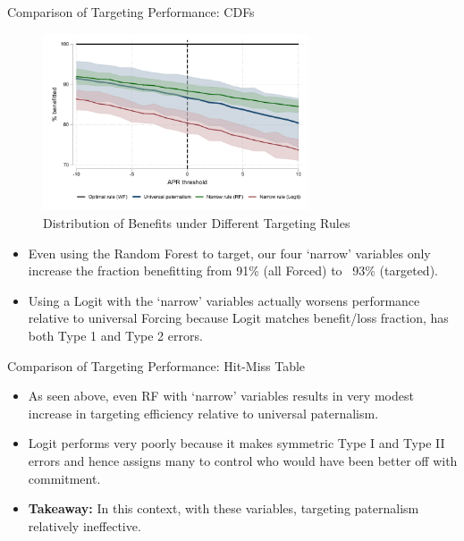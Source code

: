 \documentclass[8pt]{beamer}
\begin{document}
\begin{frame}{Comparison of Targeting Performance:  CDFs}


    
    
        \begin{figure}
        \label{targeting_CDFs}
        \caption{Distribution of Benefits under Different Targeting Rules}
        \centering
        \includegraphics[width=0.70\textwidth]{Figuras/wide_narrow_rule.pdf}
        \end{figure}

\begin{itemize}
    \item   Even using the Random Forest to target, our four `narrow' variables only increase the fraction benefitting from 91\% (all Forced) to ~93\% (targeted).
    \item  Using a Logit with the `narrow' variables actually worsens performance relative to universal Forcing because Logit matches benefit/loss fraction, has both Type 1 and Type 2 errors.
\end{itemize}        


\end{frame}



\begin{frame}{Comparison of Targeting Performance:  Hit-Miss Table}


\begin{table}[H]
\caption{Type I \& II errors using targeting narrow rules}
\label{hit_miss_rule}
\begin{center}
\resizebox{0.95\textwidth}{!}{
\small{}
}
\end{center}
\end{table} 
     

\begin{itemize}
    \item   As seen above, even RF with `narrow' variables results in very modest increase in targeting efficiency relative to universal paternalism.
    \item  Logit performs very poorly because it makes symmetric Type I and Type II errors and hence assigns many to control who would have been better off with commitment.
    \item  \textbf{Takeaway:}  In this context, with these variables, targeting paternalism relatively ineffective.
\end{itemize}        


\end{frame}
\end{document}
